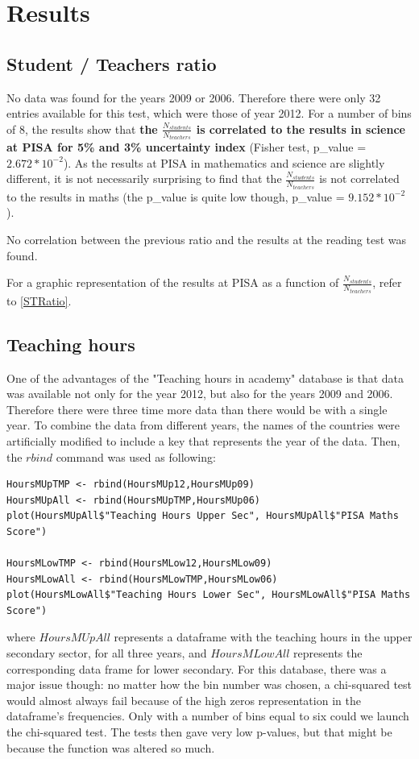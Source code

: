 \documentclass[12pt,a4paper]{article}
\begin{document}
\section{Results}

\subsection{Student / Teachers ratio}

No data was found for the years 2009 or 2006. Therefore there were only 32 entries available for this test, which were those of year 2012.
For a number of bins of 8, the results show that \textbf{the $\frac{N_{students}}{N_{teachers}}$ is correlated to the results in science at PISA for 5\% and 3\% uncertainty index} (Fisher test, p\_value = $2.672*10^{-2}$). As the results at PISA in mathematics and science are slightly different, it is not necessarily surprising to find that the $\frac{N_{students}}{N_{teachers}}$ is not correlated to the results in maths (the p\_value is quite low though, p\_value = $9.152*10^{-2}$).

No correlation between the previous ratio and the results at the reading test was found.

For a graphic representation of the results at PISA as a function of $\frac{N_{students}}{N_{teachers}}$, refer to \ref{STRatio}.

\subsection{Teaching hours}

One of the advantages of the "Teaching hours in academy" database is that data was available not only for the year 2012, but also for the years 2009 and 2006. Therefore there were three time more data than there would be with a single year.
To combine the data from different years, the names of the countries were artificially modified to include a key that represents the year of the data. Then, the $rbind$ command was used as following:
\begin{lstlisting}
HoursMUpTMP <- rbind(HoursMUp12,HoursMUp09)
HoursMUpAll <- rbind(HoursMUpTMP,HoursMUp06)
plot(HoursMUpAll$"Teaching Hours Upper Sec", HoursMUpAll$"PISA Maths Score")

HoursMLowTMP <- rbind(HoursMLow12,HoursMLow09)
HoursMLowAll <- rbind(HoursMLowTMP,HoursMLow06)
plot(HoursMLowAll$"Teaching Hours Lower Sec", HoursMLowAll$"PISA Maths Score")
\end{lstlisting}
where $HoursMUpAll$ represents a dataframe with the teaching hours in the upper secondary sector, for all three years, and $HoursMLowAll$ represents the corresponding data frame for lower secondary.
For this database, there was a major issue though: no matter how the bin number was chosen, a chi-squared test would almost always fail because of the high zeros representation in the dataframe's frequencies.
Only with a number of bins equal to six could we launch the chi-squared test. The tests then gave very low p-values, but that might be because the function was altered so much.
\end{document}
